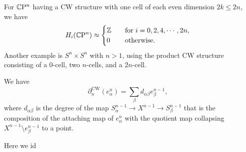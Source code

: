\begin{example}
    For $\mathbb{C} \mathrm P^n $ having a CW structure with one cell of each even dimension $2k\leq 2n$, we have \[
        H_i (\mathbb{C}\mathrm P^n ) \approx 
        \begin{cases}
            \mathbb{Z} \quad& \text{for} \ i=0,2,4,\cdots ,2n,\\
            0 &\text{otherwise.}
        \end{cases}
    \] Another example is $S^n \times S^n $ with $n>1$, using the product CW structure consisting of a $0$-cell, two $n$-cells, and a $2n$-cell.
\end{example}
\begin{theorem}
   We have \[
       \partial _n ^{\text{CW}}(e_{\alpha }^n )=\sum_{\beta }^{} d_{\alpha \beta }e_{\beta }^{n-1},
   \] where $d_{\alpha \beta }$ is the degree of the map $S_{\alpha }^{n-1}\to X^{n-1}\to S_{\beta }^{n-1}$ that is the composition of the attaching map of $e_{\alpha }^n $ with the quotient map collapsing $X^{n-1}\setminus  e_{\beta }^{n-1}$ to a point. 
\end{theorem}
Here we id
